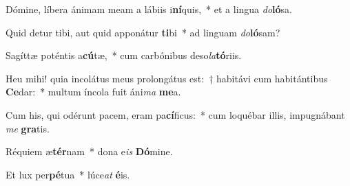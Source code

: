 ﻿\item Dómine, líbera ánimam meam a lábiis i\textbf{ní}quis,~* et a lingua \textit{do}\textbf{ló}sa.
\item Quid detur tibi, aut quid apponátur \textbf{ti}bi~* ad linguam \textit{do}\textbf{ló}sam?
\item Sagíttæ poténtis a\textbf{cú}tæ,~* cum carbónibus deso\textit{la}\textbf{tó}riis.
\item Heu mihi! quia incolátus meus prolongátus est:~† habitávi cum habitántibus \textbf{Ce}dar:~* multum íncola fuit áni\textit{ma} \textbf{me}a.
\item Cum his, qui odérunt pacem, eram pa\textbf{cí}ficus:~* cum loquébar illis, impugnábant \textit{me} \textbf{gra}tis.
\item Réquiem æ\textbf{tér}nam~* dona e\textit{is} \textbf{Dó}mine.
\item Et lux per\textbf{pé}tua~* lúce\textit{at} \textbf{é}is.